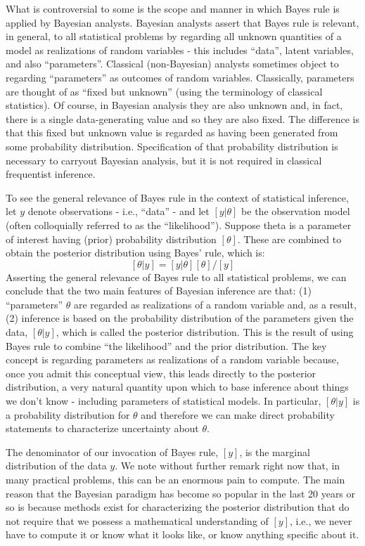 What is controversial to some is the scope and manner in which Bayes
rule is applied by Bayesian analysts. Bayesian analysts assert that
Bayes rule is relevant, in general, to all statistical problems by
regarding all unknown quantities of a model as realizations of random
variables - this includes ``data'', latent variables, and also
``parameters''. Classical (non-Bayesian) analysts sometimes object to
regarding ``parameters'' as outcomes of random variables. Classically,
parameters are thought of as ``fixed but unknown'' (using the
terminology of classical statistics). Of course, in Bayesian analysis
they are also unknown and, in fact, there is a single data-generating
value and so they are also fixed. The difference is that this fixed
but unknown value is regarded as having been generated from some
probability distribution. Specification of that probability
distribution is necessary to carryout Bayesian analysis, but it is not
required in classical frequentist inference. 


To see the general relevance of Bayes rule in the context of
statistical inference, let $y$ denote observations - i.e., ``data'' -
and let $[y|\theta]$ be the observation model (often colloquially
referred to as the ``likelihood'').  Suppose theta is a parameter of
interest having (prior) probability distribution $[\theta]$. These are
combined to obtain the posterior distribution using Bayes' rule, which
is:
\[
 [\theta|y]= [y|\theta][\theta]/[y]
\]
Asserting the general relevance of Bayes rule to all statistical
problems, we can conclude that the two main features of Bayesian
inference are that: (1) ``parameters'' $\theta$ are regarded as realizations of
a random variable and, as a result, (2) inference is based on the
probability distribution of the parameters given the data,
$[\theta|y]$,
which is
called the posterior distribution. This is the result of using Bayes
rule to combine ``the likelihood'' and the prior distribution.  The
key concept is regarding parameters as realizations of a random
variable because, once you admit this conceptual view, this leads
directly to the posterior distribution, a very natural quantity upon
which to base inference about things we don't know -  including
parameters of statistical models.  In particular, $[\theta|y]$ is a
probability distribution for $\theta$ and therefore we can make direct
probability statements to characterize uncertainty about
$\theta$. 

The denominator of our invocation of Bayes rule, $[y]$,
is the marginal distribution of the data $y$.  We note without further
remark right now that, in many practical problems, this can be an
enormous pain to compute. The main reason that the Bayesian paradigm
has become so popular in the last 20 years or so is because methods
exist for characterizing the posterior distribution that do not
require that we possess a mathematical understanding of $[y]$, i.e.,
we never have to compute it or know what it looks like, or know
anything specific about it.

